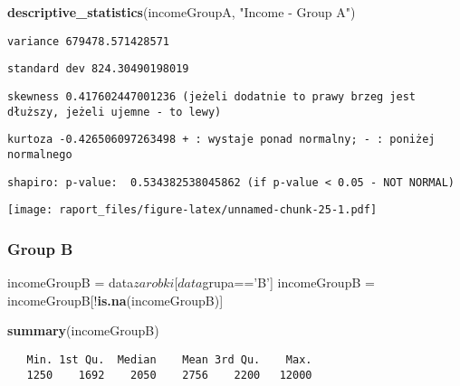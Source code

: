 \documentclass[]{article}
\newenvironment{Shaded}{\begin{snugshade}}{\end{snugshade}}
\newcommand{\KeywordTok}[1]{\textcolor[rgb]{0.13,0.29,0.53}{\textbf{{#1}}}}
\newcommand{\StringTok}[1]{\textcolor[rgb]{0.31,0.60,0.02}{{#1}}}
\newcommand{\NormalTok}[1]{{#1}}
\begin{document}
\begin{Shaded}
\begin{Highlighting}[]
\KeywordTok{descriptive_statistics}\NormalTok{(incomeGroupA, }\StringTok{"Income - Group A"}\NormalTok{)}
\end{Highlighting}
\end{Shaded}

\begin{verbatim}
variance 679478.571428571
\end{verbatim}

\begin{verbatim}
standard dev 824.30490198019
\end{verbatim}

\begin{verbatim}
skewness 0.417602447001236 (jeżeli dodatnie to prawy brzeg jest dłuższy, jeżeli ujemne - to lewy)
\end{verbatim}

\begin{verbatim}
kurtoza -0.426506097263498 + : wystaje ponad normalny; - : poniżej normalnego
\end{verbatim}

\begin{verbatim}
shapiro: p-value:  0.534382538045862 (if p-value < 0.05 - NOT NORMAL)
\end{verbatim}

\texttt{[image: raport\_files/figure-latex/unnamed-chunk-25-1.pdf]}

\subsubsection{Group B}\label{group-b-2}

\begin{Shaded}
\begin{Highlighting}[]
\NormalTok{incomeGroupB =}\StringTok{ }\NormalTok{data$zarobki[data$grupa==}\StringTok{'B'}\NormalTok{]}
\NormalTok{incomeGroupB =}\StringTok{ }\NormalTok{incomeGroupB[!}\KeywordTok{is.na}\NormalTok{(incomeGroupB)]}

\KeywordTok{summary}\NormalTok{(incomeGroupB)}
\end{Highlighting}
\end{Shaded}

\begin{verbatim}
   Min. 1st Qu.  Median    Mean 3rd Qu.    Max. 
   1250    1692    2050    2756    2200   12000 
\end{verbatim}
\end{document}

